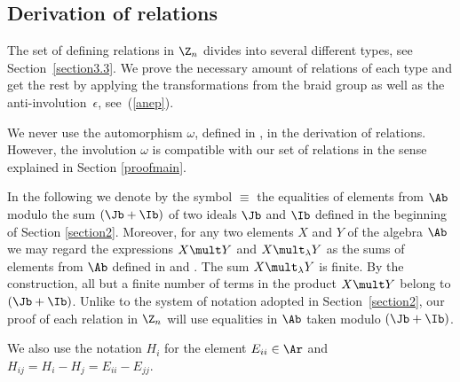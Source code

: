 \subsection{Derivation of relations}\label{sectionDerRel}

The set  of def\/ining relations in $\Z_n$ divides into several dif\/ferent types,
see Section~\ref{section3.3}. We prove the necessary amount of relations
of each type and get the rest by applying the transformations from the braid group as well as the anti-involution~$\epsilon$, see~(\ref{anep}).


We never use the automorphism $\omega$, def\/ined in , in the derivation of relations. However, the involution $\omega$ is compatible with our set
of relations in the sense explained in Section \ref{proofmain}.


In the following we denote by the symbol $ \equiv $ the equalities of elements from $\Ab$ modulo the sum $(\Jb+\Ib )$ of two ideals $\Jb$ and $\Ib$
def\/ined in the beginning of Section \ref{section2}. Moreover,
for any two elements $X$ and $Y$ of the algebra $\Ab$ we may regard the expressions $X\mult Y$ and $X\mult_\lambda Y$ as the sums
of elements from $\Ab$ def\/ined in  and . The sum $X\mult_\lambda Y$  is f\/inite. By the construction,
all but a f\/inite number of terms in the product $X\mult Y$ belong to $(\Jb+\Ib )$. Unlike to the system of notation
adopted in Section~\ref{section2}, our proof of each relation in $\Z_n$ will use equalities in $\Ab$ taken modulo $(\Jb+\Ib )$.


We also use the notation $H_i$ for the element $E_{ii}\in\Ar$ and $H_{ij}=H_i-H_j=E_{ii}-E_{jj}$.

